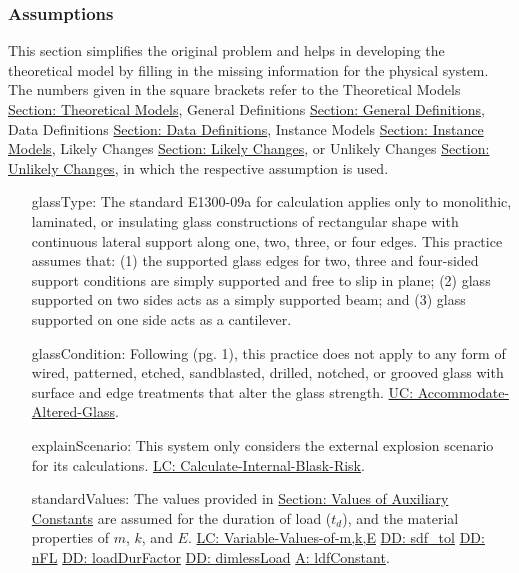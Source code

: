 \documentclass[12pt]{article}
\begin{document}
\subsubsection{Assumptions}
\label{Sec:Assumps}
This section simplifies the original problem and helps in developing the theoretical model by filling in the missing information for the physical system. The numbers given in the square brackets refer to the Theoretical Models \hyperref[Sec:TMs]{Section: Theoretical Models}, General Definitions \hyperref[Sec:GDs]{Section: General Definitions}, Data Definitions \hyperref[Sec:DDs]{Section: Data Definitions}, Instance Models \hyperref[Sec:IMs]{Section: Instance Models}, Likely Changes \hyperref[Sec:LCs]{Section: Likely Changes}, or Unlikely Changes \hyperref[Sec:UCs]{Section: Unlikely Changes}, in which the respective assumption is used.
\begin{itemize}
\item[glassType:\phantomsection\label{assumpGT}]The standard E1300-09a for calculation applies only to monolithic, laminated, or insulating glass constructions of rectangular shape with continuous lateral support along one, two, three, or four edges. This practice assumes that: (1) the supported glass edges for two, three and four-sided support conditions are simply supported and free to slip in plane; (2) glass supported on two sides acts as a simply supported beam; and (3) glass supported on one side acts as a cantilever.
\item[glassCondition:\phantomsection\label{assumpGC}]Following \cite{astm2009} (pg. 1), this practice does not apply to any form of wired, patterned, etched, sandblasted, drilled, notched, or grooved glass with surface and edge treatments that alter the glass strength. \hyperref[accAlteredGlass]{UC: Accommodate-Altered-Glass}.
\item[explainScenario:\phantomsection\label{assumpES}]This system only considers the external explosion scenario for its calculations. \hyperref[calcInternalBlastRisk]{LC: Calculate-Internal-Blask-Risk}.
\item[standardValues:\phantomsection\label{assumpSV}]The values provided in \hyperref[Sec:AuxConstants]{Section: Values of Auxiliary Constants} are assumed for the duration of load (${t_{d}}$), and the material properties of $m$, $k$, and $E$. \hyperref[varValsOfmkE]{LC: Variable-Values-of-m,k,E} \hyperref[DD:sdf.tol]{DD: sdf\_tol} \hyperref[DD:nFL]{DD: nFL} \hyperref[DD:loadDurFactor]{DD: loadDurFactor} \hyperref[DD:dimlessLoad]{DD: dimlessLoad} \hyperref[assumpLDFC]{A: ldfConstant}.

\end{itemize}
\end{document}
